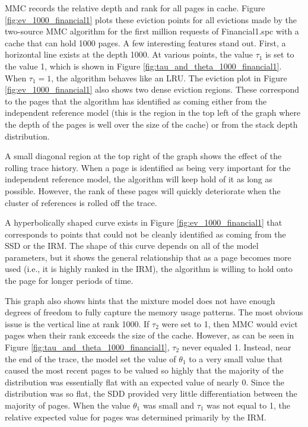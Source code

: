   MMC records the relative depth and rank for all pages in cache. Figure
  \ref{fig:ev_1000_financial1} plots these eviction points for all evictions made
  by the two-source MMC algorithm for the first million requests of
  Financial1.spc with a cache that can hold 1000 pages. A few interesting
  features stand out. First, a horizontal line exists at the depth 1000.
  At various points, the value $\tau_1$ is set to the value 1, which is shown in
  Figure \ref{fig:tau_and_theta_1000_financial1}. When $\tau_1 = 1$, the
  algorithm behaves like an LRU. The eviction plot in Figure
  \ref{fig:ev_1000_financial1} also shows two dense eviction regions. These
  correspond to the pages that the algorithm has identified as coming either from
  the independent reference model (this is the region in the top left of the
  graph where the depth of the pages is well over the size of the cache) or from
  the stack depth distribution.

  A small diagonal region at the top right of the graph shows the effect of the
  rolling trace history. When a page is identified as being very important for
  the independent reference model, the algorithm will keep hold of it as long
  as possible. However, the rank of these pages will quickly deteriorate when
  the cluster of references is rolled off the trace.

  A hyperbolically shaped curve exists in Figure \ref{fig:ev_1000_financial1}
  that corresponds to points that could not be cleanly identified as coming from
  the SSD or the IRM. The shape of this curve depends on all of the model
  parameters, but it shows the general relationship that as a page becomes more
  used (i.e., it is highly ranked in the IRM), the algorithm is willing to hold
  onto the page for longer periods of time.

  This graph also shows hints that the mixture model does not have enough
  degrees of freedom to fully capture the memory usage patterns. The most
  obvious issue is the vertical line at rank 1000. If $\tau_2$ were set to 1,
  then MMC would evict pages when their rank exceeds the size of the cache.
  However, as can be seen in Figure \ref{fig:tau_and_theta_1000_financial1},
  $\tau_2$ never equaled 1. Instead, near the end of the trace, the model set
  the value of $\theta_1$ to a very small value that caused the most recent
  pages to be valued so highly that the majority of the distribution was
  essentially flat with an expected value of nearly 0. Since the distribution
  was so flat, the SDD provided very little differentiation between the majority
  of pages. When the value $\theta_1$ was small and $\tau_1$ was not equal to
  1, the relative expected value for pages was determined primarily by
  the IRM.

